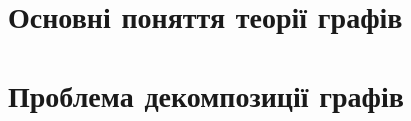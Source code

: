\documentclass[a4paper,14pt,ukrainian]{extarticle}
\begin{document}


\tableofcontents
\newpage

\section{Основні поняття теорії графів}

\newpage

\section{Проблема декомпозиції графів}


\clearpage
{}


\end{document}
